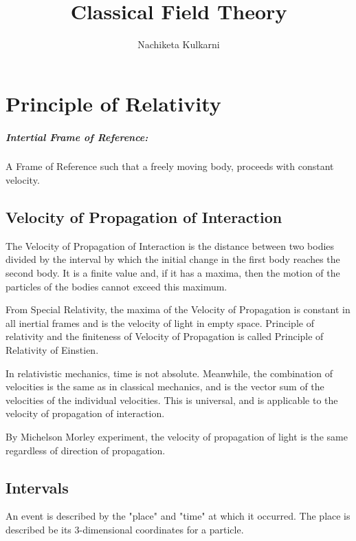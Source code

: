 \documentclass[12pt, oneside]{book}
\date{}
\title{Classical Field Theory}
\author{Nachiketa Kulkarni}
\begin{document}
\maketitle

\tableofcontents

\mainmatter
{}
\chapter{Principle of Relativity}
\paragraph{Intertial Frame of Reference:} A Frame of Reference such that a freely moving body, proceeds with constant velocity.
\section{Velocity of Propagation of Interaction}
The Velocity of Propagation of Interaction is the distance between two bodies divided by the interval by which the initial change in the first body reaches the second body.
It is a finite value and, if it has a maxima, then the motion of the particles of the bodies cannot exceed this maximum.

From Special Relativity, the maxima of the Velocity of Propagation is constant in all inertial frames and is the velocity of light in empty space.
Principle of relativity and the finiteness of Velocity of Propagation is called Principle of Relativity of Einstien.

In relativistic mechanics, time is not absolute.
Meanwhile, the combination of velocities is the same as in classical mechanics, and is the vector sum of the velocities of the individual velocities.
This is universal, and is applicable to the velocity of propagation of interaction.

By Michelson Morley experiment, the velocity of propagation of light is the same regardless of direction of propagation.

\section{Intervals}
An event is described by the "place" and "time" at which it occurred.
The place is described be its 3-dimensional coordinates for a particle.
\end{document}
